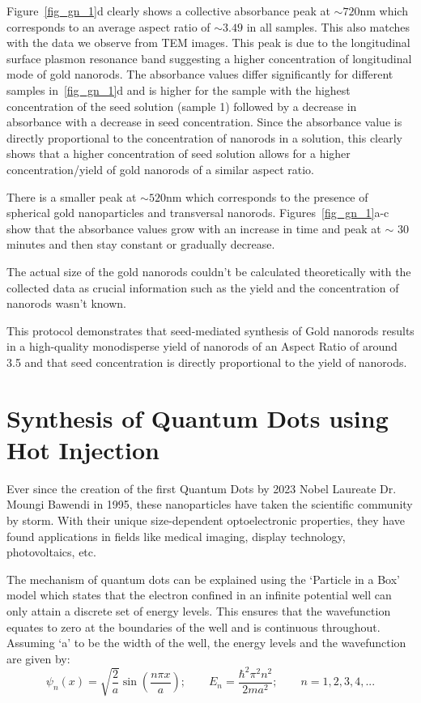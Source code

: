 \documentclass[journal=jacsat,manuscript=article]{achemso}
\begin{document}
Figure~\ref{fig_gn_1}d clearly shows a collective absorbance peak at $\sim 720$nm which corresponds to an average aspect ratio of $\sim 3.49$ in all samples. This also matches with the data we observe from TEM images. This peak is due to the longitudinal surface plasmon resonance band suggesting a higher concentration of longitudinal mode of gold nanorods. The absorbance values differ significantly for different samples in~\ref{fig_gn_1}d and is higher for the sample with the highest concentration of the seed solution (sample 1) followed by a decrease in absorbance with a decrease in seed concentration. Since the absorbance value is directly proportional to the concentration of nanorods in a solution, this clearly shows that a higher concentration of seed solution allows for a higher concentration/yield of gold nanorods of a similar aspect ratio.

There is a smaller peak at $\sim 520$nm which corresponds to the presence of spherical gold nanoparticles and transversal nanorods. Figures~\ref{fig_gn_1}a-c show that the absorbance values grow with an increase in time and peak at $\sim$ 30 minutes and then stay constant or gradually decrease.

The actual size of the gold nanorods couldn't be calculated theoretically with the collected data as crucial information such as the yield and the concentration of nanorods wasn't known.

This protocol demonstrates that seed-mediated synthesis of Gold nanorods results in a high-quality monodisperse yield of nanorods of an Aspect Ratio of around 3.5 and that seed concentration is directly proportional to the yield of nanorods.

\section{Synthesis of Quantum Dots using Hot Injection}
Ever since the creation of the first  Quantum Dots by 2023 Nobel Laureate Dr. Moungi Bawendi\cite{murray1993synthesis} in 1995, these nanoparticles have taken the scientific community by storm. With their unique size-dependent optoelectronic properties, they have found applications in fields like medical imaging, display technology, photovoltaics, etc.

The mechanism of quantum dots can be explained using the `Particle in a Box' model\cite{Modern_Vibrational} which states that the electron confined in an infinite potential well can only attain a discrete set of energy levels. This ensures that the wavefunction equates to zero at the boundaries of the well and is continuous throughout. Assuming `a' to be the width of the well, the energy levels and the wavefunction are given by:
\[\psi_n(x)=\sqrt{\frac{2}{a}} \sin(\frac{n\pi x}{a}); \quad \quad E_n = \frac{\hbar^{2} \pi^{2} n^{2}}{2ma^{2}}; \quad \quad n=1, 2, 3, 4, . . .\]
\end{document}
